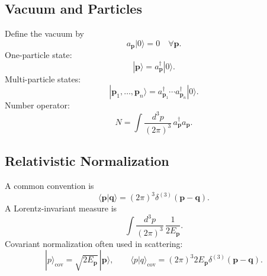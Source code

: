 \subsection{Vacuum and Particles}
Define the vacuum by
\begin{equation}
a_{\mathbf{p}}|0\rangle=0 \quad \forall \mathbf{p}.
\end{equation}
One-particle state:
\begin{equation}
|\mathbf{p}\rangle = a^\dagger_{\mathbf{p}}|0\rangle.
\end{equation}
Multi-particle states:
\begin{equation}
|\mathbf{p}_1,\dots,\mathbf{p}_n\rangle
=a^\dagger_{\mathbf{p}_1}\cdots a^\dagger_{\mathbf{p}_n}|0\rangle.
\end{equation}
Number operator:
\begin{equation}
N=\int \frac{d^3p}{(2\pi)^3}\,a^\dagger_{\mathbf{p}}a_{\mathbf{p}}.
\end{equation}

\subsection{Relativistic Normalization}
A common convention is
\begin{equation}
\langle \mathbf{p}|\mathbf{q}\rangle=(2\pi)^3\delta^{(3)}(\mathbf{p}-\mathbf{q}).
\end{equation}
A Lorentz-invariant measure is
\begin{equation}
\int \frac{d^3p}{(2\pi)^3}\,\frac{1}{2E_{\mathbf{p}}}.
\end{equation}
Covariant normalization often used in scattering:
\begin{equation}
|p\rangle_{\mathrm{cov}}=\sqrt{2E_{\mathbf{p}}}\,|\mathbf{p}\rangle,
\qquad
\langle p|q\rangle_{\mathrm{cov}}=(2\pi)^3 2E_{\mathbf{p}}\delta^{(3)}(\mathbf{p}-\mathbf{q}).
\end{equation}

